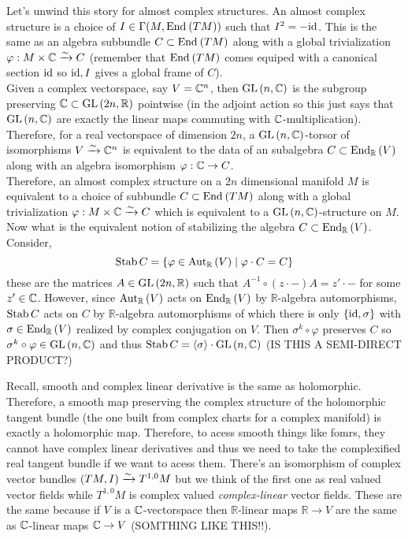 \documentclass[12pt]{extarticle}
\newcommand{\R}{\mathbb{R}}
\begin{document}
\begin{rmk}
Let's unwind this story for almost complex structures. An almost complex structure is a choice of $I \in \Gamma(M, \mathrm{End}_{}\left(TM\right))$ such that $I^2 = - \mathrm{id}$. This is the same as an algebra subbundle $C \subset \mathrm{End}_{}\left(TM\right)$ along with a global trivialization $\varphi : M \times \mathbb{C} \xrightarrow{\sim} C$ (remember that $\mathrm{End}_{}\left(TM\right)$ comes equiped with a canonical section $\mathrm{id}$ so $\mathrm{id}, I$ gives a global frame of $C$).
\bigskip\\
Given a complex vectorspace, say $V = \mathbb{C}^n$, then $\mathrm{GL}\left(n, \mathbb{C} \right)$ is the subgroup preserving $\C \subset \GL{2n, \R}$ pointwise (in the adjoint action so this just says that $\mathrm{GL}\left(n, \mathbb{C} \right)$ are exactly the linear maps commuting with $\mathbb{C}$-multiplication). Therefore, for a real vectorspace of dimension $2n$, a $\mathrm{GL}\left(n, \mathbb{C} \right)$-torsor of isomorphisms $V \xrightarrow{\sim} \mathbb{C}^n$ is equivalent to the data of an subalgebra $C \subset \End{\R}{V}$ along with an algebra isomorphism $\varphi : \mathbb{C} \to C$.
\bigskip\\
Therefore, an almost complex structure on a $2n$ dimensional manifold $M$ is equivalent to a choice of subbundle $C \subset \mathrm{End}_{}\left(TM\right)$ along with a global trivialization $\varphi : M \times \mathbb{C} \xrightarrow{\sim} C$ which is equivalent to a $\mathrm{GL}\left(n, \mathbb{C} \right)$-structure on $M$.
\bigskip\\
Now what is the equivalent notion of stabilizing the algebra $C \subset \End{\R}{V}$. Consider,
\[ \Stab{C} = \{ \varphi \in \Aut{\R}{V} \mid \varphi \cdot C = C \} \]
these are the matrices $A \in \GL{2n, \R}$ such that $A^{-1} \circ (z \cdot -) A = z' \cdot -$ for some $z' \in \mathbb{C}$. However, since $\Aut{\R}{V}$ acts on $\End{\R}{V}$ by $\R$-algebra automorphisms, $\operatorname{\operatorname{\mathrm{Stab}}}{C}$ acts on $C$ by $\R$-algebra automorphisms of which there is only $\{ \mathrm{id}, \sigma \}$ with $\sigma \in \End{\R}{V}$ realized by complex conjugation on $V$. Then $\sigma^k \circ \varphi$ preserves $C$ so $\sigma^k \circ \varphi \in \mathrm{GL}\left(n, \mathbb{C} \right)$ and thus $\operatorname{\operatorname{\mathrm{Stab}}}{C} = \left< \sigma \right> \cdot \mathrm{GL}\left(n, \mathbb{C} \right)$ (IS THIS A SEMI-DIRECT PRODUCT?) 
\end{rmk}

\begin{rmk}
Recall, smooth and complex linear derivative is the same as holomorphic. Therefore, a smooth map preserving the complex structure of the holomorphic tangent bundle (the one built from complex charts for a complex manifold) is exactly a holomorphic map. Therefore, to acess smooth things like fomrs, they cannot have complex linear derivatives and thus we need to take the complexified real tangent bundle if we want to acess them. There's an isomorphism of complex vector bundles $(TM, I) \xrightarrow{\sim} T^{1,0} M$ but we think of the first one as real valued vector fields while $T^{1,0} M$ is complex valued \textit{complex-linear} vector fields. These are the same because if $V$ is a $\mathbb{C}$-vectorspace then $\R$-linear maps $\R \to V$ are the same as $\mathbb{C}$-linear maps $\mathbb{C} \to V$ (SOMTHING LIKE THIS!!).
\end{rmk}
\end{document}
